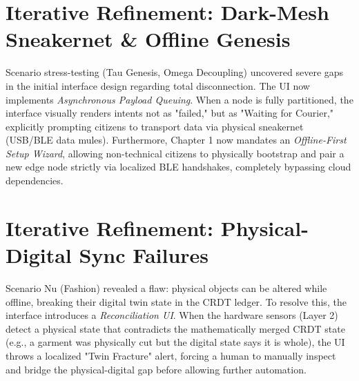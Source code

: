 \section{Iterative Refinement: Dark-Mesh Sneakernet \& Offline Genesis}
Scenario stress-testing (Tau Genesis, Omega Decoupling) uncovered severe gaps in the initial interface design regarding total disconnection. The UI now implements \textit{Asynchronous Payload Queuing}. When a node is fully partitioned, the interface visually renders intents not as "failed," but as "Waiting for Courier," explicitly prompting citizens to transport data via physical sneakernet (USB/BLE data mules). Furthermore, Chapter 1 now mandates an \textit{Offline-First Setup Wizard}, allowing non-technical citizens to physically bootstrap and pair a new edge node strictly via localized BLE handshakes, completely bypassing cloud dependencies.

\section{Iterative Refinement: Physical-Digital Sync Failures}
Scenario Nu (Fashion) revealed a flaw: physical objects can be altered while offline, breaking their digital twin state in the CRDT ledger. To resolve this, the interface introduces a \textit{Reconciliation UI}. When the hardware sensors (Layer 2) detect a physical state that contradicts the mathematically merged CRDT state (e.g., a garment was physically cut but the digital state says it is whole), the UI throws a localized "Twin Fracture" alert, forcing a human to manually inspect and bridge the physical-digital gap before allowing further automation.
